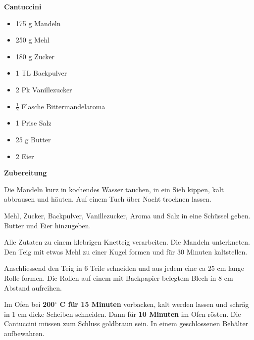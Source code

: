 

\parindent0pt	

\pagestyle{empty}


\textbf{{\LARGE Cantuccini}}%

\hrulefill
\vspace*{\fill}
\begin{multicols}{2}	


\begin{itemize}
\item 175 g 	Mandeln
\item 250 g 	Mehl
\item 180 g 	Zucker
\item 1 TL 	Backpulver
\item 2 Pk 	Vanillezucker
\item $\frac{1}{2}$ Flasche Bittermandelaroma
\item 1 Prise	Salz
\item 25 g	Butter
\item 2 	Eier
\end{itemize}
\end{multicols}
\vfill									%




\vfill
\newpage
\textbf{{\LARGE Zubereitung}}%

\hrulefill

\vspace*{\fill}
\begin{multicols}{2}

Die Mandeln kurz in kochendes Wasser tauchen, in ein Sieb kippen, kalt abbrausen und häuten.
Auf einem Tuch über Nacht trocknen lassen.\newline

Mehl, Zucker, Backpulver, Vanillezucker, Aroma und Salz in eine Schüssel
geben. Butter und Eier hinzugeben.\newline

Alle Zutaten zu einem klebrigen Knetteig verarbeiten. Die Mandeln
unterkneten.
Den Teig mit etwas Mehl zu einer Kugel formen und für 30 Minuten kaltstellen.\newline

Anschliessend den Teig in 6 Teile schneiden und aus jedem
eine ca 25 cm lange Rolle formen.
Die Rollen auf einem mit Backpapier belegtem Blech in 8 cm Abstand
aufreihen.\newline

Im Ofen bei \textbf{200$^\circ$ C für 15 Minuten} vorbacken, kalt werden lassen und
schräg in 1 cm dicke Scheiben schneiden.
Dann für \textbf{10 Minuten} im Ofen rösten.
Die Cantuccini müssen zum Schluss goldbraun sein.
In einem geschlossenen Behälter aufbewahren.

\end{multicols}
\vfill
